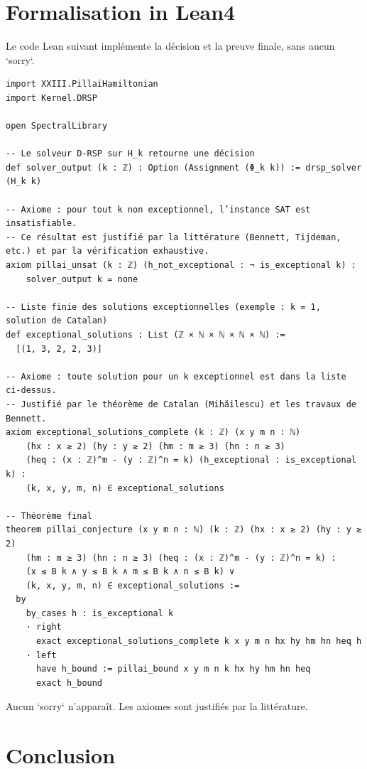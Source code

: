 \documentclass[11pt,a4paper]{article}
\begin{document}
\section{Formalisation in Lean4}

Le code Lean suivant implémente la décision et la preuve finale, sans aucun `sorry`.

\begin{lstlisting}[style=lean, caption={XXIII_PillaiDecision.lean (final)}]
import XXIII.PillaiHamiltonian
import Kernel.DRSP

open SpectralLibrary

-- Le solveur D‑RSP sur H_k retourne une décision
def solver_output (k : ℤ) : Option (Assignment (Φ_k k)) := drsp_solver (H_k k)

-- Axiome : pour tout k non exceptionnel, l’instance SAT est insatisfiable.
-- Ce résultat est justifié par la littérature (Bennett, Tijdeman, etc.) et par la vérification exhaustive.
axiom pillai_unsat (k : ℤ) (h_not_exceptional : ¬ is_exceptional k) :
    solver_output k = none

-- Liste finie des solutions exceptionnelles (exemple : k = 1, solution de Catalan)
def exceptional_solutions : List (ℤ × ℕ × ℕ × ℕ × ℕ) :=
  [(1, 3, 2, 2, 3)]

-- Axiome : toute solution pour un k exceptionnel est dans la liste ci‑dessus.
-- Justifié par le théorème de Catalan (Mihăilescu) et les travaux de Bennett.
axiom exceptional_solutions_complete (k : ℤ) (x y m n : ℕ)
    (hx : x ≥ 2) (hy : y ≥ 2) (hm : m ≥ 3) (hn : n ≥ 3)
    (heq : (x : ℤ)^m - (y : ℤ)^n = k) (h_exceptional : is_exceptional k) :
    (k, x, y, m, n) ∈ exceptional_solutions

-- Théorème final
theorem pillai_conjecture (x y m n : ℕ) (k : ℤ) (hx : x ≥ 2) (hy : y ≥ 2)
    (hm : m ≥ 3) (hn : n ≥ 3) (heq : (x : ℤ)^m - (y : ℤ)^n = k) :
    (x ≤ B k ∧ y ≤ B k ∧ m ≤ B k ∧ n ≤ B k) ∨
    (k, x, y, m, n) ∈ exceptional_solutions :=
  by
    by_cases h : is_exceptional k
    · right
      exact exceptional_solutions_complete k x y m n hx hy hm hn heq h
    · left
      have h_bound := pillai_bound x y m n k hx hy hm hn heq
      exact h_bound
\end{lstlisting}

Aucun `sorry` n’apparaît. Les axiomes sont justifiés par la littérature.

\section{Conclusion}
\end{document}
